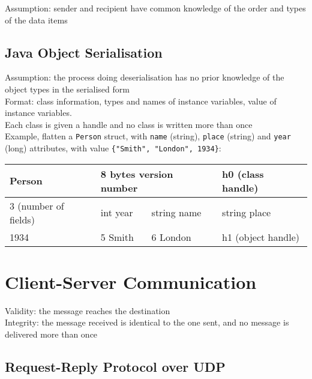 \begin{multicols*}{2}
\noindent Assumption: sender and recipient have common knowledge of the order and types of the data items

\subsection{Java Object Serialisation}

\noindent Assumption: the process doing deserialisation has no prior knowledge of the object types in the serialised form\\

\noindent Format: class information, types and names of instance variables, value of instance variables. \\

\noindent Each class is given a handle and no class is written more than once\\

\noindent Example, flatten a \verb|Person| struct, with \verb|name| (string), \verb|place| (string) and \verb|year| (long) attributes, with value \verb|{"Smith", "London", 1934}|:\\

\begin{center}
\begin{tabular}{ |p{1.8cm}|p{1.8cm}|p{1.8cm}|p{1.8cm}| } 
    \hline
    Person & \multicolumn{2}{p{3.6cm}|}{8 bytes version number} & h0 (class handle) \\
    \hline
    3 (number of fields) & int year & string name & string place \\
    \hline
    1934 & 5 Smith & 6 London & h1 (object handle) \\
    \hline
\end{tabular}
\end{center}

\section{Client-Server Communication}

\noindent Validity: the message reaches the destination\\

\noindent Integrity: the message received is identical to the one sent, and no message is delivered more than once

\subsection{Request-Reply Protocol over UDP}


\end{multicols*}
